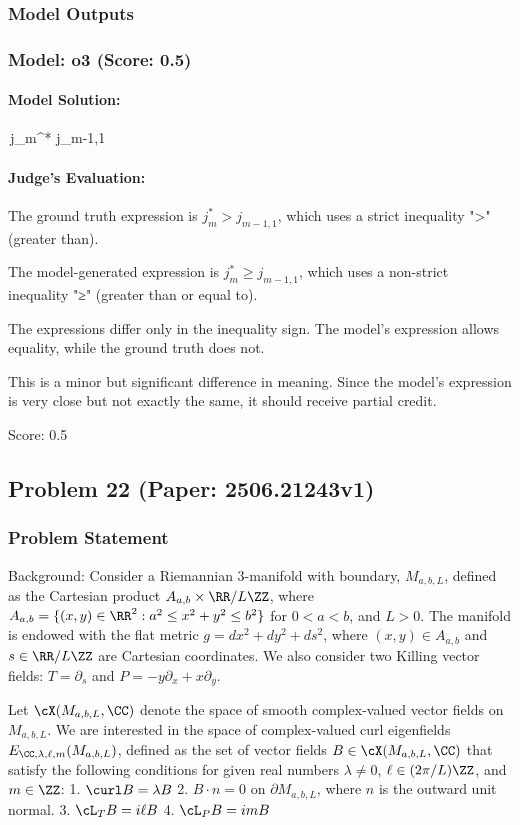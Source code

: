 \documentclass[10pt]{article}
\begin{document}
\subsubsection*{Model Outputs}
\subsubsection*{Model: o3 (Score: 0.5)}
\paragraph*{Model Solution:}
\,j_m^{\!*}\;\ge\; j_{m-1,1}\,

\paragraph*{Judge's Evaluation:}

The ground truth expression is \( j^*_m > j_{m-1,1} \), which uses a strict inequality ">" (greater than).

The model-generated expression is \( j_m^{\!*} \ge j_{m-1,1} \), which uses a non-strict inequality "≥" (greater than or equal to).

The expressions differ only in the inequality sign. The model's expression allows equality, while the ground truth does not.

This is a minor but significant difference in meaning. Since the model's expression is very close but not exactly the same, it should receive partial credit.

Score: 0.5

\newpage
\subsection*{Problem 22 (Paper: 2506.21243v1)}
\subsubsection*{Problem Statement}
Background:
Consider a Riemannian 3-manifold with boundary, $M_{a,b,L}$, defined as the Cartesian product $A_{a,b} \times \RR/L\ZZ$, where $A_{a,b} = \{(x,y) \in \RR^2 : a^2 \leq x^2+y^2 \leq b^2\}$ for $0 < a < b$, and $L > 0$. The manifold is endowed with the flat metric $g = dx^2 + dy^2 + ds^2$, where $(x,y) \in A_{a,b}$ and $s \in \RR/L\ZZ$ are Cartesian coordinates. We also consider two Killing vector fields: $T = \partial_s$ and $P = -y\partial_x + x\partial_y$.

Let $\cX(M_{a,b,L},\CC)$ denote the space of smooth complex-valued vector fields on $M_{a,b,L}$. We are interested in the space of complex-valued curl eigenfields $E_{\CC,\lambda,\ell,m}(M_{a,b,L})$, defined as the set of vector fields $B \in \cX(M_{a,b,L},\CC)$ that satisfy the following conditions for given real numbers $\lambda \neq 0$, $\ell \in (2\pi/L)\ZZ$, and $m \in \ZZ$:
1.  $\curl B = \lambda B$
2.  $B \cdot n = 0$ on $\partial M_{a,b,L}$, where $n$ is the outward unit normal.
3.  $\cL_T B = i\ell B$
4.  $\cL_P B = im B$
\end{document}
